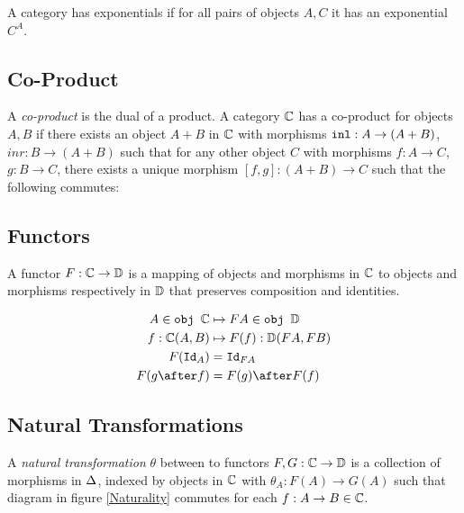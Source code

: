 \documentclass{Report}
\begin{document}

A category has exponentials if for all pairs of objects $A, C$ it has an exponential $C^A$.

\subsection{Co-Product}
A \textit{co-product} is the dual of a product. A category $\mathbb{C}$ has a co-product for objects $A, B$ if there exists an object $A+B$ in $\mathbb{C}$ with morphisms $\texttt{inl}: A\rightarrow (A+B)$, $inr: B\rightarrow (A+B)$ such that for any other object $C$ with morphisms $f: A\rightarrow C$, $g: B\rightarrow C$, there exists a unique morphism $[f, g]: (A + B)\rightarrow C $ such that the following commutes:





\subsection{Functors}
A functor $F: \mathbb{C} \rightarrow \mathbb{D}$ is a mapping of objects and morphisms in $\mathbb{C}$ to objects and morphisms respectively in $\mathbb{D}$ that preserves composition and identities.

\begin{align}
    A\in\obj\C &\mapsto FA \in \obj\DC\\
    f: \C(A, B) &\mapsto F(f): \DC(FA, FB)\\
    F(\Id{A}) & = \Id{FA} \\
    F(g\after f) & = F(g)\after F(f)
\end{align}

\subsection{Natural Transformations}

A \textit{natural transformation} $\theta$ between to functors $F, G: \mathbb{C} \rightarrow \mathbb{D}$ is a collection of morphisms in $\Delta$, indexed by objects in $\mathbb{C}$ with  $\theta_A: F(A) \rightarrow G(A)$ such that diagram in figure \ref{Naturality} commutes for each $f: A \rightarrow B \in \mathbb{C}$.
\end{document}

